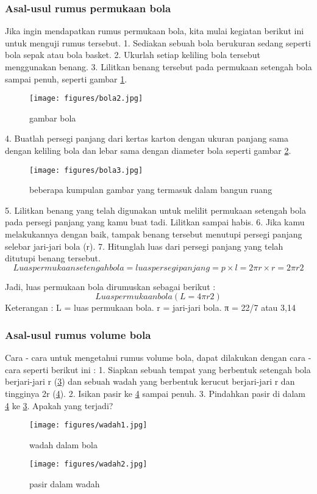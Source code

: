 \subsubsection{Asal-usul rumus permukaan bola}
Jika ingin mendapatkan rumus permukaan bola, kita mulai kegiatan berikut ini untuk menguji rumus tersebut.
1. Sediakan sebuah bola berukuran sedang seperti bola sepak atau bola basket.
2. Ukurlah setiap keliling bola tersebut menggunakan benang.
3. Lilitkan benang tersebut pada permukaan setengah bola sampai penuh, seperti gambar \ref{bola2}.
\begin{figure}[ht]
    \centerline{\texttt{[image: figures/bola2.jpg]}}
    \caption{gambar bola}
    \label{bola2}
    \end{figure}
4. Buatlah persegi panjang dari kertas karton dengan ukuran panjang sama dengan keliling bola dan lebar sama dengan diameter bola seperti gambar \ref{bola3}.
\begin{figure}[ht]
    \centerline{\texttt{[image: figures/bola3.jpg]}}
    \caption{beberapa kumpulan gambar yang termasuk dalam bangun ruang}
    \label{bola3}
    \end{figure}
5. Lilitkan benang yang telah digunakan untuk melilit permukaan setengah bola pada persegi panjang yang kamu buat tadi. Lilitkan sampai habis.
6. Jika kamu melakukannya dengan baik, tampak benang tersebut menutupi persegi panjang selebar jari-jari bola (r).
7. Hitunglah luas dari persegi panjang yang telah ditutupi benang tersebut. 
\begin{equation}
Luas permukaan setengah bola = luas persegi panjang
                                           = p × l
                                           = 2πr× r
                                           = 2π r2
\end{equation}

Jadi, luas permukaan bola dirumuskan sebagai berikut :
\begin{equation}
Luas permukaan bola ( L = 4πr2 )
\end{equation}
Keterangan :
L = luas permukaan bola.
r = jari-jari bola.
π = 22/7 atau 3,14

\subsubsection{Asal-usul rumus volume bola}
Cara - cara untuk mengetahui rumus volume bola, dapat dilakukan dengan cara - cara seperti berikut ini : 
1. Siapkan sebuah tempat yang berbentuk setengah bola berjari-jari r (\ref{wadah1}) dan sebuah wadah yang berbentuk kerucut berjari-jari r dan tingginya 2r (\ref{wadah2}).
2. Isikan pasir ke \ref{wadah2} sampai penuh.
3. Pindahkan pasir di dalam \ref{wadah2} ke \ref{wadah1}. Apakah yang terjadi?
\begin{figure}[ht]
    \centerline{\texttt{[image: figures/wadah1.jpg]}}
    \caption{wadah dalam bola}
    \label{wadah1}
    \end{figure}
\begin{figure}[ht]
    \centerline{\texttt{[image: figures/wadah2.jpg]}}
    \caption{pasir dalam wadah}
    \label{wadah2}
    \end{figure}

